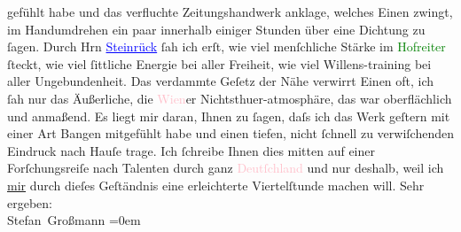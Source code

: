                gefühlt habe und das verfluchte Zeitungshandwerk anklage, welches Einen zwingt, im
               Handumdrehen {\pb}ein paar \label{K_L02052_1v}\label{K_L02052_1h} innerhalb einiger Stunden
               über eine Dichtung zu ſagen.\pend
           \pstart
           Durch Hrn \textcolor{blue}{\uline{Steinrück}}{}\ledrightnote{\textcolor{blue}{Albert Steinrück}} ſah ich erſt, wie viel menſchliche Stärke im \textcolor{green}{Hofreiter}{}\ledrightnote{\textcolor{green}{Das weite Land. Tragikomödie in fünf Akten}} ſteckt, wie viel ſittliche Energie bei aller Freiheit, wie viel
               Willens-training bei aller Ungebundenheit.\pend
           \pstart
           Das verdammte Geſetz der Nähe verwirrt Einen oft, ich ſah nur {\pb}das Äußerliche, die \textcolor{pink}{Wien}{}\ledrightnote{\textcolor{pink}{Wien}}er Nichtsthuer-atmosphäre, das war oberflächlich und anmaßend.\pend
           \pstart
           Es liegt mir daran, Ihnen zu ſagen, daſs ich das Werk geſtern mit einer Art Bangen
               mitgefühlt habe und einen tiefen, nicht ſchnell zu verwiſchenden Eindruck nach Hauſe
               trage.\pend
           \pstart
           Ich ſchreibe Ihnen dies mitten auf einer Forſchungsreiſe nach Talenten durch ganz \textcolor{pink}{Deutſchland}{}\ledrightnote{\textcolor{pink}{Deutschland}} und nur deshalb, {\pb}weil ich \uline{mir}
               durch dieſes Geſtändnis eine erleichterte Viertelſtunde machen will.\pend
           \pstart
           Sehr ergeben:{\\[\baselineskip]}\spacefill\mbox{Stefan Großmann}\pend
           \leftskip=0em{}\endnumbering{}  
      